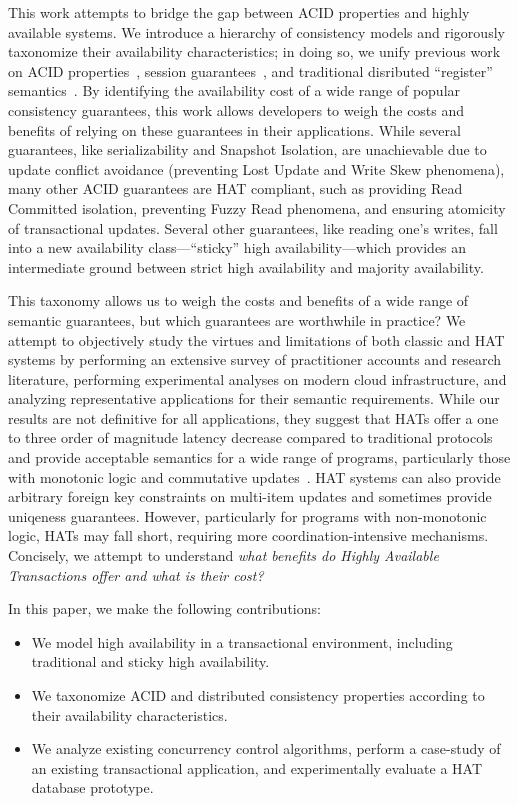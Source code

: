 This work attempts to bridge the gap between ACID properties and
highly available systems. We introduce a hierarchy of consistency
models and rigorously taxonomize their availability characteristics;
in doing so, we unify previous work on ACID properties~\cite{adya},
session guarantees~\cite{sessionguarantees}, and traditional
disributed ``register'' semantics~\cite{herlihy-art}. By identifying
the availability cost of a wide range of popular consistency
guarantees, this work allows developers to weigh the costs and
benefits of relying on these guarantees in their applications. While
several guarantees, like serializability and Snapshot Isolation, are
unachievable due to update conflict avoidance (preventing Lost Update
and Write Skew phenomena), many other ACID guarantees are HAT
compliant, such as providing Read Committed isolation, preventing
Fuzzy Read phenomena, and ensuring atomicity of transactional
updates. Several other guarantees, like reading one's writes, fall
into a new availability class---``sticky'' high availability---which
provides an intermediate ground between strict high availability and
majority availability.

This taxonomy allows us to weigh the costs and benefits of a wide
range of semantic guarantees, but which guarantees are worthwhile in
practice? We attempt to objectively study the virtues and limitations
of both classic and HAT systems by performing an extensive survey of
practitioner accounts and research literature, performing experimental
analyses on modern cloud infrastructure, and analyzing representative
applications for their semantic requirements. While our results are
not definitive for all applications, they suggest that HATs offer a
one to three order of magnitude latency decrease compared to
traditional protocols and provide acceptable semantics for a wide
range of programs, particularly those with monotonic logic and
commutative updates~\cite{calm, blooml, crdt}. HAT systems can also
provide arbitrary foreign key constraints on multi-item updates and
sometimes provide uniqeness guarantees. However, particularly for
programs with non-monotonic logic, HATs may fall short, requiring more
coordination-intensive mechanisms. Concisely, we attempt to understand
\textit{what benefits do Highly Available Transactions offer and what
  is their cost?}

In this paper, we make the following contributions:

\begin{itemize}
\item We model high availability in a transactional environment,
  including traditional and sticky high availability.

\item We taxonomize ACID and distributed consistency properties
  according to their availability characteristics.

\item We analyze existing concurrency control algorithms, perform a
  case-study of an existing transactional application, and
  experimentally evaluate a HAT database prototype.
\end{itemize}

